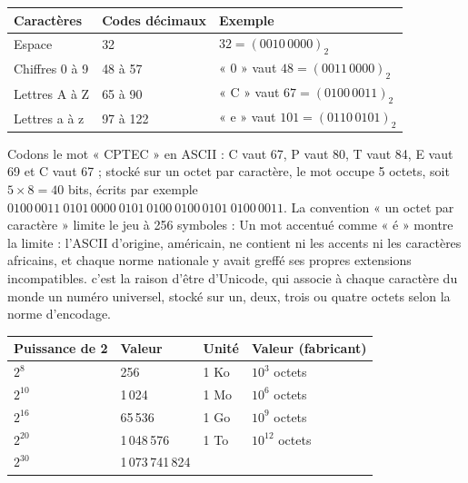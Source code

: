 \begin{center}
\small
\begin{tabular}{L{4.6cm}L{4.6cm}L{5.0cm}}
\toprule
{}\textbf{Caractères} & \textbf{Codes décimaux} & \textbf{Exemple}\\
\midrule
Espace & 32 & $32 = (0010\,0000)_2$\\
Chiffres 0 à 9 & 48 à 57 & « 0 » vaut $48 = (0011\,0000)_2$\\
Lettres A à Z & 65 à 90 & « C » vaut $67 = (0100\,0011)_2$\\
Lettres a à z & 97 à 122 & « e » vaut $101 = (0110\,0101)_2$\\
\bottomrule
\end{tabular}
\label{ch3:tab:ascii}
\end{center}

\begin{exemple}
Codons le mot « CPTEC » en ASCII : C vaut 67, P vaut 80, T vaut 84, E vaut 69 et C vaut 67 ; stocké sur un octet par caractère, le mot occupe 5 octets, soit $5 \times 8 = 40$ bits, écrits par exemple $0100\,0011\ 0101\,0000\ 0101\,0100\ 0100\,0101\ 0100\,0011$. La convention « un octet par caractère » limite le jeu à 256 symboles : Un mot accentué comme « é » montre la limite : l'ASCII d'origine, américain, ne contient ni les accents ni les caractères africains, et chaque norme nationale y avait greffé ses propres extensions incompatibles. c'est la raison d'être d'Unicode, qui associe à chaque caractère du monde un numéro universel, stocké sur un, deux, trois ou quatre octets selon la norme d'encodage.
\end{exemple}

\begin{center}
\small
\begin{tabular}{C{2.6cm}C{3.0cm}C{2.6cm}C{3.2cm}}
\toprule
{}\textbf{Puissance de 2} & \textbf{Valeur} & \textbf{Unité} & \textbf{Valeur (fabricant)}\\
\midrule
$2^{8}$ & 256 & 1 Ko & $10^{3}$ octets\\
$2^{10}$ & 1\,024 & 1 Mo & $10^{6}$ octets\\
$2^{16}$ & 65\,536 & 1 Go & $10^{9}$ octets\\
$2^{20}$ & 1\,048\,576 & 1 To & $10^{12}$ octets\\
$2^{30}$ & 1\,073\,741\,824 & & \\
\bottomrule
\end{tabular}
\label{ch3:tab:puissances}
\end{center}

